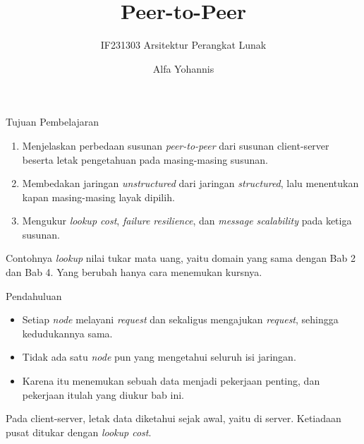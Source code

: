 \documentclass[aspectratio=169, table, 12pt]{beamer}
\title{\Huge{Peer-to-Peer}}
\subtitle{IF231303 Arsitektur Perangkat Lunak}
\author{Alfa Yohannis}
\begin{document}
\frame{\titlepage}

\begin{frame}{{\Large Tujuan Pembelajaran}}
  \vspace{10pt}
  \begin{enumerate}
    \item Menjelaskan perbedaan susunan \textit{peer-to-peer} dari susunan
          client-server beserta letak pengetahuan pada masing-masing susunan.
    \item Membedakan jaringan \textit{unstructured} dari jaringan \textit{structured}, lalu
          menentukan kapan masing-masing layak dipilih.
    \item Mengukur \textit{lookup cost}, \textit{failure resilience}, dan
          \textit{message scalability} pada ketiga susunan.
  \end{enumerate}

  \vspace{10pt}
  {\small Contohnya \textit{lookup} nilai tukar mata uang, yaitu domain yang sama
  dengan Bab 2 dan Bab 4. Yang berubah hanya cara menemukan kursnya.}
\end{frame}

\begin{frame}{{\Large Pendahuluan}}
  \vspace{8pt}
  \begin{itemize}\small
    \item Setiap \textit{node} melayani \textit{request} dan sekaligus mengajukan
          \textit{request}, sehingga kedudukannya sama.
    \item Tidak ada satu \textit{node} pun yang mengetahui seluruh isi jaringan.
    \item Karena itu menemukan sebuah data menjadi pekerjaan penting,
          dan pekerjaan itulah yang diukur bab ini.
  \end{itemize}

  \vspace{8pt}
  {\small Pada client-server, letak data diketahui sejak awal, yaitu di server.
  Ketiadaan pusat ditukar dengan \textit{lookup cost}.}
\end{frame}
\end{document}
